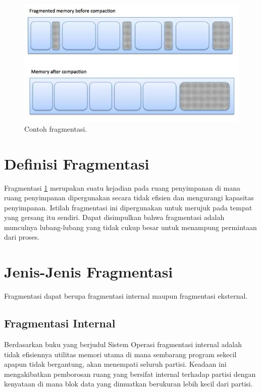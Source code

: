 ﻿%

\begin{figure}[ht]
\centerline{\includegraphics[width=1\textwidth]{figures/fragmentation.jpg}}
\caption{Contoh fragmentasi.}
\label{fragmentasi}
\end{figure}

\section{Definisi Fragmentasi}
Fragmentasi \ref{fragmentasi} merupakan suatu kejadian pada ruang penyimpanan di mana ruang penyimpanan dipergunakan secara tidak efisien dan mengurangi kapasitas penyimpanan. Istilah fragmentasi ini dipergunakan untuk merujuk pada tempat yang gersang itu sendiri. Dapat disimpulkan bahwa fragmentasi adalah munculnya lubang-lubang yang tidak cukup besar untuk menampung permintaan dari proses.

\section{Jenis-Jenis Fragmentasi}
Fragmentasi dapat berupa fragmentasi internal maupun fragmentasi eksternal.
\subsection{Fragmentasi Internal}
Berdasarkan buku yang berjudul Sistem Operasi \cite{pangera2005sistem} fragmentasi internal adalah tidak efisiennya utilitas memori utama di mana sembarang program sekecil apapun tidak bergantung, akan menempati seluruh partisi. Keadaan ini mengakibatkan pemborosan ruang yang bersifat internal terhadap partisi dengan kenyataan di mana blok data yang dimuatkan berukuran lebih kecil dari partisi.

